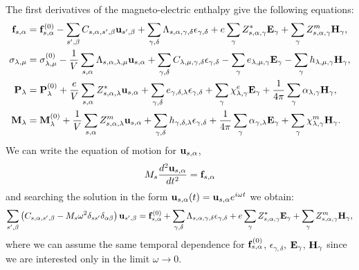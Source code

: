 \documentclass[12pt,a4paper]{article}
\begin{document}
{\color{orange}
The first derivatives of the magneto-electric enthalpy give the following equations:
\begin{align}
{\bf f}_{s,\alpha}&= {\bf f}^{(0)}_{s,\alpha}
-\sum_{s',\beta} C_{s,\alpha,s',\beta} {\bf u}_{s',\beta}
+\sum_{\gamma,\delta}
\Lambda_{s,\alpha,\gamma,\delta} 
\epsilon_{\gamma,\delta} +
e \sum_{\gamma} Z^*_{s,\alpha,\gamma} {\bf E}_{\gamma}
+\sum_{\gamma} 
Z^m_{s,\alpha,\gamma} {\bf H}_{\gamma}, \\
\sigma_{\lambda,\mu}&=  \sigma_{\lambda,\mu}^{(0)}
-{1\over V} \sum_{s,\alpha}
\Lambda_{s,\alpha,\lambda,\mu} {\bf u}_{s,\alpha}
+\sum_{\gamma,\delta} C_{\lambda,\mu,\gamma,\delta}  
\epsilon_{\gamma,\delta} -
\sum_{\gamma} e_{\lambda,\mu,\gamma} 
 {\bf E}_{\gamma}
-\sum_{\gamma}  h_{\lambda,\mu,\gamma} 
{\bf H}_{\gamma}, \\
{\bf P}_{\lambda}&= {\bf P}^{(0)}_{\lambda}
+{e\over V} \sum_{s,\alpha} Z^*_{s,\alpha,\lambda} 
{\bf u}_{s,\alpha} +
\sum_{\gamma,\delta} e_{\gamma,\delta,\lambda} 
\epsilon_{\gamma,\delta} +
\sum_{\gamma} 
\chi^e_{\lambda,\gamma}
{\bf E}_{\gamma} +
{1\over 4 \pi} \sum_{\gamma} \alpha_{\lambda,\gamma} 
{\bf H}_{\gamma}, \\
{\bf M}_{\lambda}&= {\bf M}^{(0)}_{\lambda}
+{1\over V}\sum_{s,\alpha} 
Z^m_{s,\alpha,\lambda} {\bf u}_{s,\alpha} +
\sum_{\gamma,\delta}  h_{\gamma,\delta,\lambda} 
\epsilon_{\gamma,\delta} 
+{1\over 4 \pi} \sum_{\gamma} \alpha_{\gamma,\lambda} {\bf E}_{\gamma}
+\sum_{\gamma} 
\chi^m_{\lambda,\gamma}
{\bf H}_{\gamma}.
\end{align}
We can write the equation of motion for ${\bf u}_{s,\alpha}$,
\begin{equation}
M_s {d^2 {\bf u}_{s,\alpha} \over d t^2} = {\bf f}_{s,\alpha}
\end{equation}
and searching the solution in the form ${\bf u}_{s,\alpha}(t)=
{\bf u}_{s,\alpha} e^{i\omega t}$ we obtain:
\begin{equation}
\sum_{s',\beta} \left(C_{s,\alpha,s',\beta} - 
M_s \omega^2 \delta_{ss'}\delta_{\alpha\beta}\right)
{\bf u}_{s',\beta}= {\bf f}^{(0)}_{s,\alpha} + \sum_{\gamma,\delta} 
\Lambda_{s,\alpha,\gamma,\delta} \epsilon_{\gamma,\delta}
+ e \sum_{\gamma} Z^*_{s,\alpha,\gamma} {\bf E}_{\gamma} 
+ \sum_{\gamma} Z^m_{s,\alpha,\gamma} 
{\bf H}_{\gamma},
\end{equation}
where we can assume the same temporal dependence for
${\bf f}^{(0)}_{s,\alpha}$, $\epsilon_{\gamma,\delta}$,
${\bf E}_{\gamma}$,
${\bf H}_{\gamma}$ since we are interested only in the limit
$\omega \rightarrow 0$.
}
\end{document}
